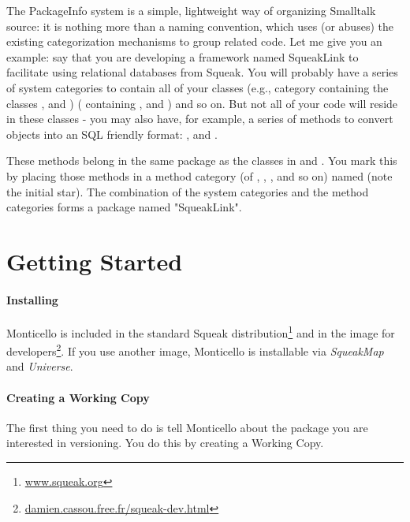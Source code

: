 \documentclass[a4paper,10pt,twoside]{book}
\begin{document}
The PackageInfo system is a simple, lightweight way of organizing Smalltalk source: it is nothing more than a naming convention, which uses (or abuses) the existing categorization mechanisms to group related code. Let me give you an example: say that you are developing a framework named SqueakLink to facilitate using relational databases from Squeak. You will probably have a series of system categories to contain all of your classes (e.g., category  containing the classes ,  and )
( containing ,   and ) and so on. But not all of your code will reside in these classes - you may also have, for example, a series of methods to convert objects into an SQL friendly format: ,   and .

These methods belong in the same package as the classes in  and . You mark this by placing those methods in a method category (of , , , and so on) named  (note the initial star). The combination of the  system categories and the  method categories forms a package named "SqueakLink".


\section{Getting Started}

\paragraph{Installing}

Monticello is included in the standard Squeak distribution\footnote{\href{http://www.squeak.org}{www.squeak.org}} and in the image for developers\footnote{\href{http://damien.cassou.free.fr/squeak-dev.html}{damien.cassou.free.fr/squeak-dev.html}}. If you use another image, Monticello is installable via \emph{SqueakMap} and \emph{Universe}.


\paragraph{Creating a Working Copy}

The first thing you need to do is tell Monticello about the package you are interested in versioning. You do this by creating a Working Copy.
\end{document}
